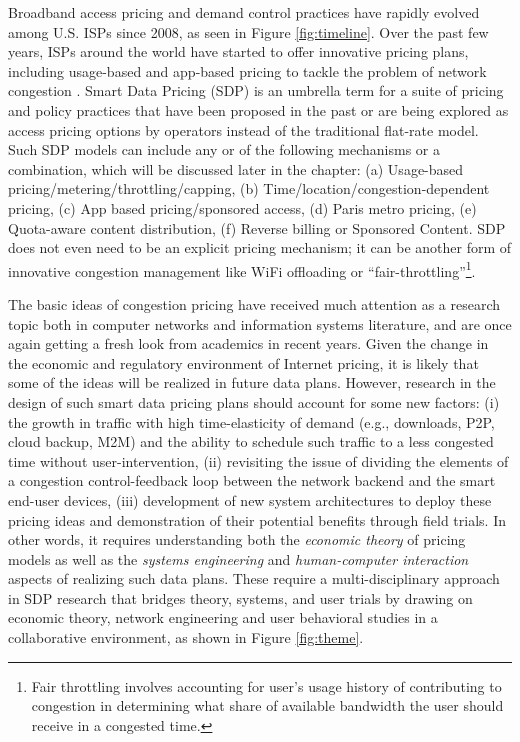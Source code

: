 Broadband access pricing and demand control practices have rapidly evolved among U.S. ISPs since 2008, as seen in Figure \ref{fig:timeline}. Over the past few years, ISPs around the world have started to offer innovative pricing plans, including usage-based and app-based pricing to tackle the problem of network congestion \cite{computing-survey}. Smart Data Pricing (SDP) \cite{SDP2013} is an umbrella term for a suite of pricing and policy practices that have    
been proposed in the past or are being explored as access pricing options by operators instead of the traditional flat-rate model. Such SDP models can include any or of the following mechanisms or a combination, which will be discussed later in the chapter: (a) Usage-based pricing/metering/throttling/capping, (b) Time/location/congestion-dependent pricing, (c) App based pricing/sponsored access, (d) Paris metro pricing, (e) Quota-aware content distribution, (f) Reverse billing or Sponsored Content. SDP does not even need to be an explicit pricing mechanism; it can be another form of innovative congestion management like WiFi offloading or ``fair-throttling''\footnote{Fair throttling involves accounting for user's usage history of contributing to congestion in determining what share of available bandwidth the user should receive in a congested time.}.

The basic ideas of congestion pricing have received much attention as a research topic both in computer networks and information systems literature, and are once again getting a fresh look from academics in recent years. Given the change in the economic and regulatory environment of Internet pricing, it is likely that some of the ideas will be realized in future data plans. However, research in the design of such smart data pricing plans should account for some new factors: (i) the growth in traffic with high time-elasticity of demand (e.g., downloads, P2P, cloud backup, M2M) and the ability to schedule such traffic to a less congested time without user-intervention, (ii) revisiting the issue of dividing the elements of a congestion control-feedback loop between the network backend and the smart end-user devices, (iii) development of new system architectures to deploy these pricing ideas and demonstration of their potential benefits through field trials. In other words, it requires understanding both the \emph{economic theory} of pricing models as well as the \emph{systems engineering} and \emph{human-computer interaction} aspects of realizing such data plans. These require a multi-disciplinary approach in SDP research that bridges theory, systems, and user trials by drawing on economic theory, network engineering and user behavioral studies in a collaborative environment, as shown in Figure \ref{fig:theme}.

